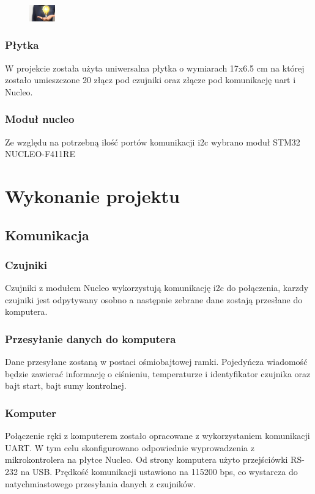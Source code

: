 \documentclass[a4paper,12pt]{article}
\begin{document}
			\begin{figure}[H]
		     	 \includegraphics[width=0.1\textwidth]{obrazy/plytka.png}
			\end{figure}
		
			\subsubsection{Płytka}
				W projekcie została użyta uniwersalna płytka o wymiarach 17x6.5 cm na której zostało umieszczone 20 złącz pod czujniki oraz złącze pod komunikację uart i Nucleo. 
						
			\subsubsection{Moduł nucleo}
				Ze względu na potrzebną ilość portów komunikacji i2c wybrano moduł STM32 NUCLEO-F411RE
			
	\section{Wykonanie projektu}		
		\subsection{Komunikacja}
			\subsubsection{Czujniki}		
				Czujniki z modułem Nucleo wykorzystują komunikację i2c do połączenia, karzdy czujniki jest odpytywany osobno a następnie zebrane dane zostają przesłane do komputera.
			\subsubsection{Przesyłanie danych do komputera}
			Dane przesyłane zostaną w postaci ośmiobajtowej ramki. Pojedyńcza wiadomość będzie zawierać informację o ciśnieniu, temperaturze i identyfikator czujnika oraz bajt start, bajt sumy kontrolnej.
			\subsubsection{Komputer}
				Połączenie ręki z komputerem zostało opracowane z wykorzystaniem komunikacji UART. W tym celu skonfigurowano odpowiednie wyprowadzenia z mikrokontrolera na płytce Nucleo. Od strony komputera użyto przejściówki RS-232 na USB. Prędkość komunikacji ustawiono na 115200 bps, co wystarcza do natychmiastowego przesyłania danych z czujników.	
\end{document}
